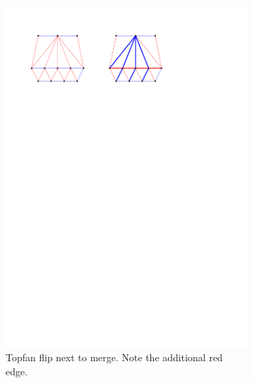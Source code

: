 \begin{figure}[!b]
\begin{subfigure}[t]{0.45 \textwidth}
        \includegraphics[width =\textwidth]{topFanFlips/img/mergeend}
        \caption{Topfan flip next to merge. Note the additional red edge.}
        \label{fig:fanflip:mergeLastVertex}
    \end{subfigure}
    \centering
    \begin{subfigure}[t]{0.45 \textwidth}

\end{subfigure}
\end{figure}

